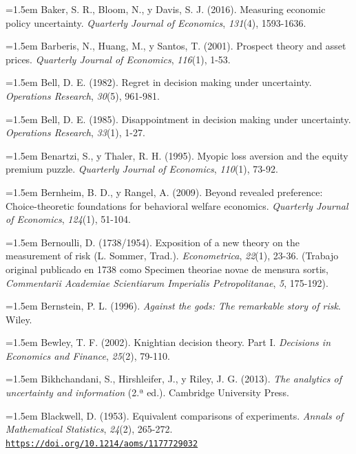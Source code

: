 \documentclass[10pt,a4paper]{article}
\begin{document}
\noindent\hangindent=1.5em Baker, S. R., Bloom, N., y Davis, S. J. (2016). Measuring economic policy uncertainty. \textit{Quarterly Journal of Economics}, \textit{131}(4), 1593-1636.

\noindent\hangindent=1.5em Barberis, N., Huang, M., y Santos, T. (2001). Prospect theory and asset prices. \textit{Quarterly Journal of Economics}, \textit{116}(1), 1-53.

\noindent\hangindent=1.5em Bell, D. E. (1982). Regret in decision making under uncertainty. \textit{Operations Research}, \textit{30}(5), 961-981.

\noindent\hangindent=1.5em Bell, D. E. (1985). Disappointment in decision making under uncertainty. \textit{Operations Research}, \textit{33}(1), 1-27.

\noindent\hangindent=1.5em Benartzi, S., y Thaler, R. H. (1995). Myopic loss aversion and the equity premium puzzle. \textit{Quarterly Journal of Economics}, \textit{110}(1), 73-92.

\noindent\hangindent=1.5em Bernheim, B. D., y Rangel, A. (2009). Beyond revealed preference: Choice-theoretic foundations for behavioral welfare economics. \textit{Quarterly Journal of Economics}, \textit{124}(1), 51-104.

\noindent\hangindent=1.5em Bernoulli, D. (1738/1954). Exposition of a new theory on the measurement of risk (L. Sommer, Trad.). \textit{Econometrica}, \textit{22}(1), 23-36. (Trabajo original publicado en 1738 como Specimen theoriae novae de mensura sortis, \textit{Commentarii Academiae Scientiarum Imperialis Petropolitanae}, \textit{5}, 175-192).

\noindent\hangindent=1.5em Bernstein, P. L. (1996). \textit{Against the gods: The remarkable story of risk}. Wiley.

\noindent\hangindent=1.5em Bewley, T. F. (2002). Knightian decision theory. Part I. \textit{Decisions in Economics and Finance}, \textit{25}(2), 79-110.

\noindent\hangindent=1.5em Bikhchandani, S., Hirshleifer, J., y Riley, J. G. (2013). \textit{The analytics of uncertainty and information} (2.ª ed.). Cambridge University Press.

\noindent\hangindent=1.5em Blackwell, D. (1953). Equivalent comparisons of experiments. \textit{Annals of Mathematical Statistics}, \textit{24}(2), 265-272. \href{https://doi.org/10.1214/aoms/1177729032}{\nolinkurl{https://doi.org/10.1214/aoms/1177729032}}
\end{document}
